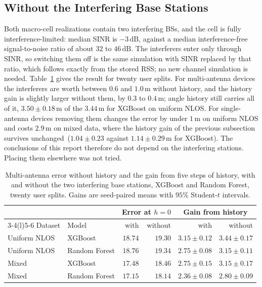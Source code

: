 \subsection{Without the Interfering Base Stations}
\label{subsec:no-interference}

Both macro-cell realizations contain two interfering BSs, and the cell is fully interference-limited: median SINR is $-3\,\text{dB}$, against a median interference-free signal-to-noise ratio of about $32$ to $46\,\text{dB}$. The interferers enter only through SINR, so switching them off is the same simulation with SINR replaced by that ratio, which follows exactly from the stored RSS; no new channel simulation is needed. Table~\ref{tab:no-interference} gives the result for twenty user splits. For multi-antenna devices the interferers are worth between $0.6$ and $1.0\,\text{m}$ without history, and the history gain is slightly larger without them, by $0.3$ to $0.4\,\text{m}$; angle history still carries all of it, $3.50 \pm 0.18\,\text{m}$ of the $3.44\,\text{m}$ for XGBoost on uniform NLOS. For single-antenna devices removing them changes the error by under $1\,\text{m}$ on uniform NLOS and costs $2.9\,\text{m}$ on mixed data, where the history gain of the previous subsection survives unchanged~($1.04 \pm 0.23$ against $1.14 \pm 0.29\,\text{m}$ for XGBoost). The conclusions of this report therefore do not depend on the interfering stations. Placing them elsewhere was not tried.

\begin{table}[h]
  \centering
  \caption{Multi-antenna error without history and the gain from five steps of history, with and without the two interfering base stations, XGBoost and Random Forest, twenty user splits. Gains are seed-paired means with $95\%$ Student-$t$ intervals.}
  \label{tab:no-interference}
  \small
  \begin{tabular}{@{}llrrrr@{}}
    \toprule
    & & \multicolumn{2}{c}{Error at $h=0$} & \multicolumn{2}{c}{Gain from history} \\
    \cmidrule(lr){3-4}\cmidrule(l){5-6}
    Dataset & Model & with & without & with & without \\
    \midrule
    Uniform NLOS & XGBoost & $18.74$ & $19.30$ & $3.15 \pm 0.12$ & $3.44 \pm 0.17$ \\
    Uniform NLOS & Random Forest & $18.76$ & $19.34$ & $2.75 \pm 0.08$ & $3.15 \pm 0.11$ \\
    Mixed & XGBoost & $17.48$ & $18.46$ & $2.75 \pm 0.15$ & $3.15 \pm 0.17$ \\
    Mixed & Random Forest & $17.15$ & $18.14$ & $2.36 \pm 0.08$ & $2.80 \pm 0.09$ \\
    \bottomrule
  \end{tabular}
\end{table}
